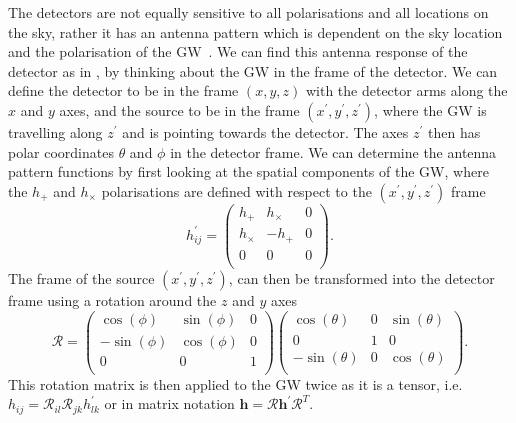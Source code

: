 The detectors are not equally sensitive to all polarisations and all locations
on the sky, rather it has an antenna pattern which is dependent on the sky
location and the polarisation of the \gls{GW}~. We can find this antenna response of the detector as in
\citep{maggioreGravitationalWaves}, by thinking about the \gls{GW} in the frame
of the detector.  We can define the detector to be in the frame $(x,y,z)$ with
the detector arms along the $x$ and $y$ axes, and the source to be in the frame
$(x^{\prime},y^{\prime},z^{\prime})$, where the \gls{GW} is travelling along
$z^{'}$ and is pointing towards the detector.  The axes $z^{\prime}$ then has
polar coordinates $\theta$ and $\phi$ in the detector frame.  We can determine
the antenna pattern functions by first looking at the spatial components of the
\gls{GW},
where the $h_{+}$ and $h_{\times}$ polarisations are defined with respect to
the $(x^{\prime},y^{\prime},z^{\prime})$ frame
%
\begin{equation}
    \label{intro:detector:response:gwwave}
    h^{\prime}_{ij} = \left( 
    \begin{matrix} 
    h_{+} & h_{\times} & 0 \\
    h_{\times} & -h_{+} & 0 \\
    0 & 0 & 0  \\
    \end{matrix}
    \right).
\end{equation}
The frame of the source $(x^{\prime},y^{\prime},z^{\prime})$, can then be transformed into the detector frame using a rotation around the $z$ and $y$ axes 
\begin{equation}
    \label{intro:detector:response:rotation}
    \mathcal{R} = \left( 
    \begin{matrix} 
    \cos(\phi) & \sin(\phi) & 0 \\
    -\sin(\phi) & \cos(\phi) & 0 \\
    0 & 0 & 1  \\
    \end{matrix}
    \right)
    \left( 
    \begin{matrix} 
    \cos(\theta) & 0 & \sin(\theta) \\
    0 & 1 & 0 \\
    -\sin(\theta) & 0 & \cos(\theta)  \\
    \end{matrix}
    \right).
\end{equation}
This rotation matrix is then applied to the \gls{GW} twice as it is a tensor, i.e. $h_{ij} = \mathcal{R}_{il} \mathcal{R}_{jk} h^{\prime}_{lk} $ or in matrix notation $\bm{h} = \bm{\mathcal{R}} \bm{h}^{\prime} \bm{\mathcal{R}}^{T}$.

